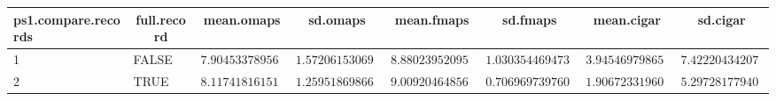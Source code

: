 %
\begin{table}[!tbp]
\begin{center}
\begin{tabular}{llrrrrrr}
\hline\hline
\multicolumn{1}{l}{ps1.compare.records}&\multicolumn{1}{c}{full.record}&\multicolumn{1}{c}{mean.omaps}&\multicolumn{1}{c}{sd.omaps}&\multicolumn{1}{c}{mean.fmaps}&\multicolumn{1}{c}{sd.fmaps}&\multicolumn{1}{c}{mean.cigar}&\multicolumn{1}{c}{sd.cigar}\tabularnewline
\hline
1&FALSE&$7.90453378956373$&$1.57206153069562$&$8.88023952095808$&$1.030354469473312$&$3.94546979865772$&$7.42220434207389$\tabularnewline
2&TRUE&$8.11741816151323$&$1.25951869866502$&$9.00920464856565$&$0.706969739760412$&$1.90672331960634$&$5.29728177940373$\tabularnewline
\hline
\end{tabular}
\end{center}
\end{table}

